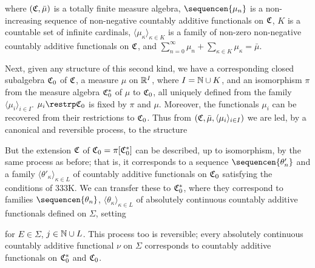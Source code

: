 \noindent where $(\frak C,\bar\mu)$ is a totally finite measure algebra,
$\sequencen{\mu_n}$ is a non-increasing sequence of
non-negative countably additive
functionals on $\frak C$, $K$ is a countable set of infinite cardinals,
$\langle\mu_{\kappa}\rangle_{\kappa\in K}$ is a family of non-zero
non-negative countably additive functionals on $\frak C$, and
$\sum_{n=0}^{\infty}\mu_n+\sum_{\kappa\in K}\mu_{\kappa}
=\bar\mu$.

Next, given any structure of this second kind, we have a corresponding
closed subalgebra $\frak C_0$ of $\frak C$, a measure $\mu$ on $\Bbb
R^I$, where $I=\Bbb N\cup K$, and an isomorphism $\pi$ from the measure
algebra $\frak C_0^*$ of $\mu$ to $\frak C_0$, all uniquely
defined from the family $\langle\mu_i\rangle_{i\in I}$.    $\mu_i\restrp\frak C_0$ is fixed by $\pi$ and
$\mu$.   Moreover, the functionals $\mu_i$ can be recovered from their
restrictions to $\frak C_0$.   Thus
from $(\frak C,\bar\mu,\langle\mu_i\rangle_{i\in I})$ we are led, by a
canonical and reversible process, to the structure


But the extension $\frak C$ of $\frak C_0=\pi[\frak C_0^*]$ can
be described, up to isomorphism, by the same process as before;  that
is, it corresponds to a sequence $\sequencen{\theta'_n}$ and a family
$\langle\theta'_{\kappa}\rangle_{\kappa\in L}$ of countably additive
functionals on $\frak C_0$ satisfying the conditions of 333K.   We can
transfer these to $\frak C_0^*$, where they correspond to
families $\sequencen{\theta_n}$,
$\langle\theta_{\kappa}\rangle_{\kappa\in L}$ of absolutely continuous
countably additive functionals defined on $\Sigma$, setting


\noindent for $E\in\Sigma$, $j\in\Bbb N\cup L$.   This process too is
reversible;  every absolutely continuous countably additive functional
$\nu$ on $\Sigma$ corresponds to countably additive functionals on
$\frak C_0^*$ and $\frak C_0$.   

